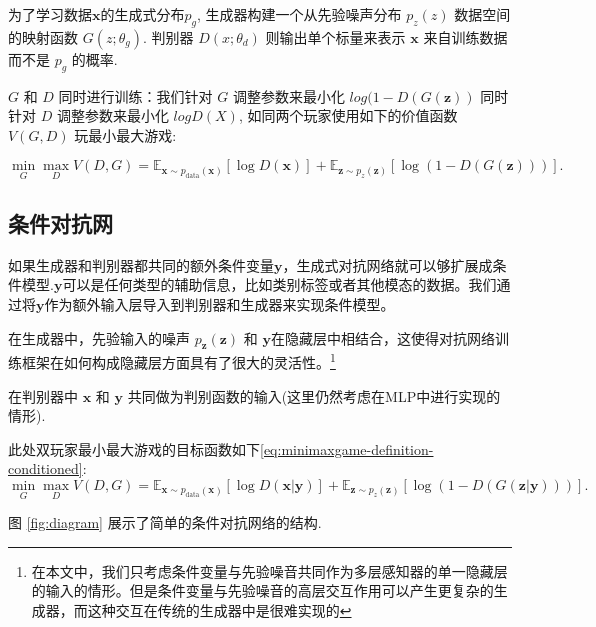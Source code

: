 \documentclass{article} %
\begin{document}
为了学习数据${\bm{x}}$的生成式分布${p_g}$, 生成器构建一个从先验噪声分布 ${p_z(z)}$ 数据空间的映射函数 ${G(z;\theta_g)}$. 判别器 ${D(x; \theta_d)}$ 则输出单个标量来表示 ${\bm{x}}$ 来自训练数据而不是 ${p_g}$ 的概率.

${G}$ 和 ${D}$ 同时进行训练：我们针对 ${G}$ 调整参数来最小化 ${log(1-D(G(\bm{z}))}$ 同时针对 $D$ 调整参数来最小化 ${logD(X)}$, 如同两个玩家使用如下的价值函数 ${V(G, D)}$ 玩最小最大游戏:


\begin{equation}
\label{eq:minimaxgame-definition}
\min_G \max_D V(D, G) = \mathbb{E}_{\bm{x} \sim p_{\text{data}}(\bm{x})}[\log D(\bm{x})] + \mathbb{E}_{\bm{z} \sim p_z(\bm{z})}[\log (1 - D(G(\bm{z})))].
\end{equation}


\subsection{条件对抗网}

如果生成器和判别器都共同的额外条件变量${\bm{y}}$，生成式对抗网络就可以够扩展成条件模型.${\bm{y}}$可以是任何类型的辅助信息，比如类别标签或者其他模态的数据。我们通过将${\bm{y}}$作为额外输入层导入到判别器和生成器来实现条件模型。


在生成器中，先验输入的噪声 $p_{\bm{z}}(\bm{z})$ 和 ${\bm{y}}$在隐藏层中相结合，这使得对抗网络训练框架在如何构成隐藏层方面具有了很大的灵活性。\footnote{在本文中，我们只考虑条件变量与先验噪音共同作为多层感知器的单一隐藏层的输入的情形。但是条件变量与先验噪音的高层交互作用可以产生更复杂的生成器，而这种交互在传统的生成器中是很难实现的}

在判别器中 ${\bm{x}}$ 和 ${\bm{y}}$ 共同做为判别函数的输入(这里仍然考虑在MLP中进行实现的情形).

此处双玩家最小最大游戏的目标函数如下\ref{eq:minimaxgame-definition-conditioned}:
\begin{equation}
\label{eq:minimaxgame-definition-conditioned}
\min_G \max_D V(D, G) = \mathbb{E}_{\bm{x} \sim p_{\text{data}}(\bm{x})}[\log D(\bm{x} | \bm{y})] + \mathbb{E}_{\bm{z} \sim p_z(\bm{z})}[\log (1 - D(G(\bm{z} | \bm{y})))].
\end{equation}

图 \ref{fig:diagram} 展示了简单的条件对抗网络的结构.
\end{document}
